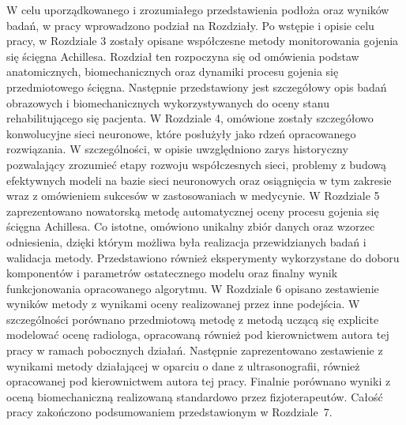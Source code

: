 W celu uporządkowanego i zrozumiałego przedstawienia podłoża oraz wyników badań, w pracy wprowadzono podział na Rozdziały. Po wstępie i opisie celu pracy, w Rozdziale 3 zostały opisane współczesne metody monitorowania gojenia się ścięgna Achillesa. Rozdział ten rozpoczyna się od omówienia podstaw anatomicznych, biomechanicznych oraz dynamiki procesu gojenia się przedmiotowego ścięgna. Następnie przedstawiony jest szczegółowy opis badań obrazowych i biomechanicznych wykorzystywanych do oceny stanu rehabilitującego się pacjenta. W Rozdziale 4, omówione zostały szczegółowo konwolucyjne sieci neuronowe, które posłużyły jako rdzeń opracowanego rozwiązania. W szczególności, w opisie uwzględniono zarys historyczny pozwalający zrozumieć etapy rozwoju współczesnych sieci, problemy z budową efektywnych modeli na bazie sieci neuronowych oraz osiągnięcia w tym zakresie wraz z omówieniem sukcesów w zastosowaniach w medycynie. W Rozdziale 5 zaprezentowano nowatorską metodę automatycznej oceny procesu gojenia się ścięgna Achillesa. Co istotne, omówiono unikalny zbiór danych oraz wzorzec odniesienia, dzięki którym możliwa była realizacja przewidzianych badań i walidacja metody. Przedstawiono również eksperymenty wykorzystane do doboru komponentów i parametrów ostatecznego modelu oraz finalny wynik funkcjonowania opracowanego algorytmu. W Rozdziale 6 opisano zestawienie wyników metody z wynikami oceny realizowanej przez inne podejścia. W szczególności porównano przedmiotową metodę z metodą uczącą się explicite modelować ocenę radiologa, opracowaną również pod kierownictwem autora tej pracy w ramach pobocznych działań. Następnie zaprezentowano zestawienie z wynikami metody działającej w oparciu o dane z ultrasonografii, również opracowanej pod kierownictwem autora tej pracy. Finalnie porównano wyniki z oceną biomechaniczną realizowaną standardowo przez fizjoterapeutów. Całość pracy zakończono podsumowaniem przedstawionym w Rozdziale~7.   



